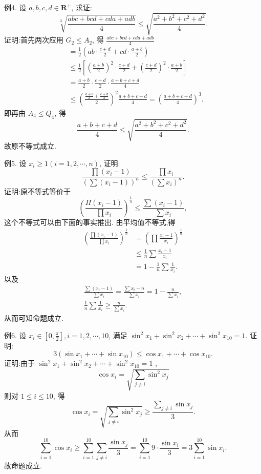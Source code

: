 例4. 设 $a, b, c, d \in \mathbf{R}^{+}$, 求证:
$$
\sqrt[3]{\frac{a b c+b c d+c d a+a d b}{4}} \leqslant \sqrt{\frac{a^2+b^2+c^2+d^2}{4}} .
$$
证明:首先两次应用 $G_2 \leqslant A_2$, 得
$\frac{a b c+b c d+c d a+a d b}{4}$
$$
\begin{aligned}
& =\frac{1}{2}\left(a b \cdot \frac{c+d}{2}+c d \cdot \frac{a+b}{2}\right) \\
& \leqslant \frac{1}{2}\left[\left(\frac{a+b}{2}\right)^2 \cdot \frac{c+d}{2}+\left(\frac{c+d}{2}\right)^2 \cdot \frac{a+b}{2}\right] \\
& =\frac{a+b}{2} \cdot \frac{c+d}{2} \cdot \frac{a+b+c+d}{4} \\
& \leqslant\left(\frac{\frac{a+b}{2}+\frac{c+d}{2}}{2}\right)^2 \frac{a+b+c+d}{4}=\left(\frac{a+b+c+d}{4}\right)^3 .
\end{aligned}
$$
即再由 $A_4 \leqslant Q_4$, 得
$$
\frac{a+b+c+d}{4} \leqslant \sqrt{\frac{a^2+b^2+c^2+d^2}{4}} .
$$
故原不等式成立.



例5. 设 $x_i \geqslant 1(i=1,2, \cdots, n)$, 证明:
$$
\frac{\prod\left(x_i-1\right)}{\left(\sum\left(x_i-1\right)\right)^n} \leqslant \frac{\prod x_i}{\left(\sum x_i\right)^n} .
$$
证明:原不等式等价于
$$
\left(\frac{\Pi\left(x_i-1\right)}{\prod x_i}\right)^{\frac{1}{n}} \leqslant \frac{\sum\left(x_i-1\right)}{\sum x_i},
$$
这个不等式可以由下面的事实推出.
由平均值不等式,得
$$
\begin{aligned}
\left(\frac{\prod\left(x_i-1\right)}{\prod x_i}\right)^{\frac{1}{n}} & =\left(\prod \frac{x_i-1}{x_i}\right)^{\frac{1}{n}} \\
& \leqslant \frac{1}{n} \sum \frac{x_i-1}{x_i} \\
& =1-\frac{1}{n} \sum \frac{1}{x_i} .
\end{aligned}
$$
以及
$$
\begin{gathered}
\frac{\sum\left(x_i-1\right)}{\sum x_i}=\frac{\sum x_i-n}{\sum x_i}=1-\frac{n}{\sum x_i}, \\
\frac{1}{n} \sum \frac{1}{x_i} \geqslant \frac{n}{\sum x_i} .
\end{gathered}
$$
从而可知命题成立.



例6. 设 $x_i \in\left[0, \frac{\pi}{2}\right], i=1,2, \cdots, 10$, 满足 $\sin ^2 x_1+\sin ^2 x_2+\cdots+ \sin ^2 x_{10}=1$. 证明:
$$
3\left(\sin x_1+\cdots+\sin x_{10}\right) \leqslant \cos x_1+\cdots+\cos x_{10} .
$$
证明:由于 $\sin ^2 x_1+\sin ^2 x_2+\cdots+\sin ^2 x_{10}=1$ ,
$$
\cos x_i=\sqrt{\sum_{j \neq i} \sin ^2 x_j}
$$
则对 $1 \leqslant i \leqslant 10$, 得
$$
\cos x_i=\sqrt{\sum_{j \neq i} \sin ^2 x_j} \geqslant \frac{\sum_{j \neq i} \sin x_j}{3} .
$$
从而
$$
\sum_{i=1}^{10} \cos x_i \geqslant \sum_{i=1}^{10} \sum_{j \neq i} \frac{\sin x_j}{3}=\sum_{i=1}^{10} 9 \cdot \frac{\sin x_i}{3}=3 \sum_{i=1}^{10} \sin x_i .
$$
故命题成立.



